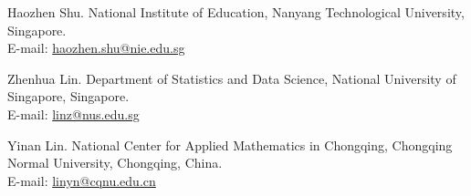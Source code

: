 \documentclass[12pt]{article}
\numberwithin{equation}{section}
\newcommand{\referencefont}{\bibhang=1.7pc\bibsep=2pt\fontsize{9}{14pt plus.8pt minus .6pt}\selectfont}
\begin{document}


\referencefont


\bigskip
\noindent\begin{minipage}{\textwidth}
\noindent Haozhen Shu. National Institute of Education, Nanyang Technological University, Singapore.\\
E-mail: \href{mailto:haozhen.shu@nie.edu.sg}{haozhen.shu@nie.edu.sg}
\medskip

\noindent Zhenhua Lin. Department of Statistics and Data Science, National University of Singapore, Singapore.\\
E-mail: \href{mailto:linz@nus.edu.sg}{linz@nus.edu.sg}
\medskip

\noindent Yinan Lin. National Center for Applied Mathematics in Chongqing, Chongqing Normal University, Chongqing, China.\\
E-mail: \href{mailto:linyn@cqnu.edu.cn}{linyn@cqnu.edu.cn}
\end{minipage}
\end{document}
